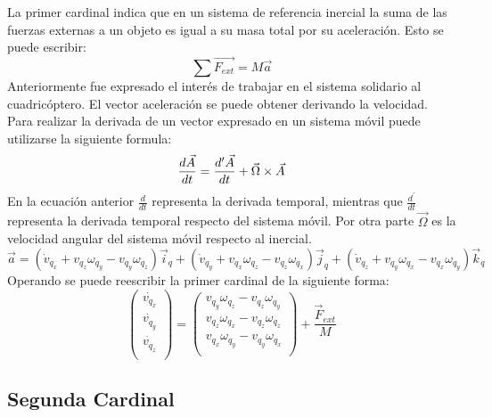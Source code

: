 \documentclass[main]{subfiles}
\begin{document}
La primer cardinal indica que en un sistema de referencia inercial la suma de las fuerzas externas a un objeto es igual a su masa total por su aceleraci\'on. Esto se puede escribir:
\begin{equation}
\sum \vec{F_{ext}} = M\vec{a}
\end{equation}
Anteriormente fue expresado el inter\'es de trabajar en el sistema solidario al cuadric\'optero. 
El vector aceleraci\'on se puede obtener derivando la velocidad. Para realizar la derivada de un vector expresado en un sistema m\'ovil puede utilizarse la siguiente formula:
\begin{equation}
\frac{d\vec{A}}{dt} =\frac{d^\prime\vec{A}}{dt}+\vec{\Omega}\times\vec{A} \\
\end{equation}
En la ecuaci\'on anterior $\frac{d}{dt}$ representa la derivada temporal, mientras que $\frac{d^\prime}{dt}$ representa la derivada temporal respecto del sistema m\'ovil. Por otra parte $\vec{\Omega}$ es la velocidad angular del sistema m\'ovil respecto al inercial. 
\begin{equation}
\vec{a} = (\dot{v}_{q_x}+v_{q_z} \omega_{q_y} - v_{q_y} \omega_{q_z} )\vec{i}_q + (\dot{v}_{q_y}+v_{q_x} \omega_{q_z} - v_{q_z} \omega_{q_x} )\vec{j}_q+(\dot{v}_{q_z}+v_{q_y} \omega_{q_x} - v_{q_x} \omega_{q_y} )\vec{k}_q
\end{equation}
Operando se puede reescribir la primer cardinal de la siguiente forma:
\begin{equation}
\left(\begin{array}{c}\dot{v_{q_x}}\\
\dot{v_{q_y}}\\
\dot{v_{q_z}}\\
\end{array} \right) = \left(\begin{array}{c}
v_{q_y} \omega_{q_z} - v_{q_z} \omega_{q_y}	\\
v_{q_z} \omega_{q_x} - v_{q_z} \omega_{q_z}\\
v_{q_x} \omega_{q_y} - v_{q_y} \omega_{q_x}\\
\end{array}\right) + \frac{\vec{F}_{ext} }{M}
\label{eq:vpuntos}
\end{equation}

\subsection{Segunda Cardinal}
\end{document}

